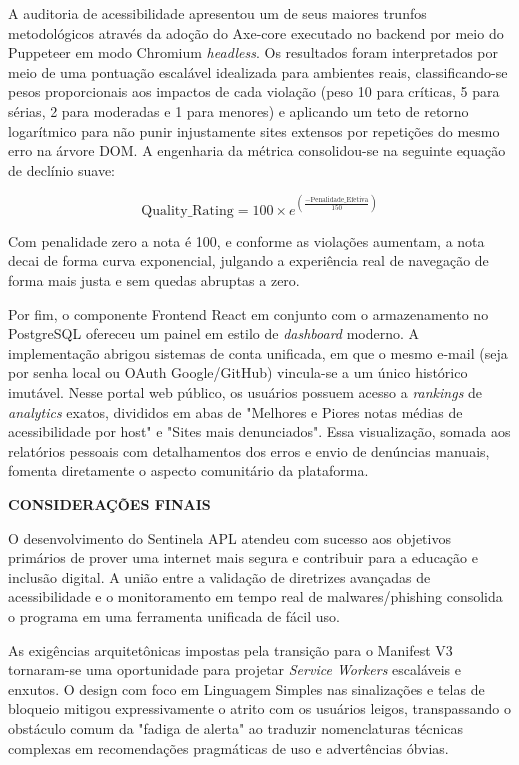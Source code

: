 \documentclass[12pt, a4paper]{article}
\newcommand{\titlesection}[1]{
    \vspace{1.5em}
    \noindent\textbf{\MakeUppercase{#1}}
    \vspace{1em}\par
}
\begin{document}
A auditoria de acessibilidade apresentou um de seus maiores trunfos metodológicos através da adoção do Axe-core executado no backend por meio do Puppeteer em modo Chromium \textit{headless}. Os resultados foram interpretados por meio de uma pontuação escalável idealizada para ambientes reais, classificando-se pesos proporcionais aos impactos de cada violação (peso 10 para críticas, 5 para sérias, 2 para moderadas e 1 para menores) e aplicando um teto de retorno logarítmico para não punir injustamente sites extensos por repetições do mesmo erro na árvore DOM. A engenharia da métrica consolidou-se na seguinte equação de declínio suave:

\[ \text{Quality\_Rating} = 100 \times e^{\left(\frac{-\text{Penalidade\_Efetiva}}{150}\right)} \]

Com penalidade zero a nota é 100, e conforme as violações aumentam, a nota decai de forma curva exponencial, julgando a experiência real de navegação de forma mais justa e sem quedas abruptas a zero.

Por fim, o componente Frontend React em conjunto com o armazenamento no PostgreSQL ofereceu um painel em estilo de \textit{dashboard} moderno. A implementação abrigou sistemas de conta unificada, em que o mesmo e-mail (seja por senha local ou OAuth Google/GitHub) vincula-se a um único histórico imutável. Nesse portal web público, os usuários possuem acesso a \textit{rankings} de \textit{analytics} exatos, divididos em abas de "Melhores e Piores notas médias de acessibilidade por host" e "Sites mais denunciados". Essa visualização, somada aos relatórios pessoais com detalhamentos dos erros e envio de denúncias manuais, fomenta diretamente o aspecto comunitário da plataforma.

\titlesection{CONSIDERAÇÕES FINAIS}

O desenvolvimento do Sentinela APL atendeu com sucesso aos objetivos primários de prover uma internet mais segura e contribuir para a educação e inclusão digital. A união entre a validação de diretrizes avançadas de acessibilidade e o monitoramento em tempo real de malwares/phishing consolida o programa em uma ferramenta unificada de fácil uso.

As exigências arquitetônicas impostas pela transição para o Manifest V3 tornaram-se uma oportunidade para projetar \textit{Service Workers} escaláveis e enxutos. O design com foco em Linguagem Simples nas sinalizações e telas de bloqueio mitigou expressivamente o atrito com os usuários leigos, transpassando o obstáculo comum da "fadiga de alerta" ao traduzir nomenclaturas técnicas complexas em recomendações pragmáticas de uso e advertências óbvias.
\end{document}
